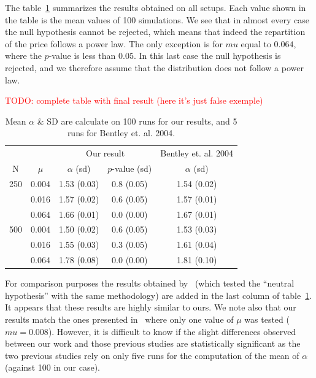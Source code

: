 \documentclass{wscpaperproc}
\newcommand{\memo}[2]{\textcolor{#1}{#2}}
\newcommand{\todo}[1]{\memo{red}{TODO: #1\\}}
\begin{document}

The table~\ref{tab:mualpha} summarizes the results obtained on all setups. Each value shown in the table is the mean values of 100 simulations. We see that in almost every case the null hypothesis cannot be rejected, which means that indeed the repartition of the price follows a power law. The only exception is for $mu$ equal to $0.064$, where the $p$-value is less than $0.05$. In this last case the null hypothesis is rejected, and we therefore assume that the distribution does not follow a power law.

\todo{complete table with final result (here it's just false exemple)}
\begin{table}[!h]
	\centering
	\begin{tabular}{cc|ccc}
		\multicolumn{2}{r}{}&\multicolumn{2}{c}{Our result}&\multicolumn{1}{c}{Bentley et. al. 2004}\\
			N&$\mu$ & $\alpha$ (sd) & $p$-value (sd) &$\alpha$ (sd)\\\hline
		250	&0.004&1.53 (0.03)&0.8 (0.05)&1.54 (0.02)\\
			&0.016&1.57 (0.02)&0.6 (0.05)&1.57 (0.01)\\
			&0.064&1.66 (0.01)&0.0 (0.00)&1.67 (0.01)\\\hline
		500	&0.004&1.50 (0.02)&0.6 (0.05)&1.53 (0.03)\\
			&0.016&1.55 (0.03)&0.3 (0.05)&1.61 (0.04)\\
			&0.064&1.78 (0.08)&0.0 (0.00)&1.81 (0.10)\\
	\end{tabular}
	\caption{Mean $\alpha$ \& SD are calculate on 100 runs for our results, and 5 runs for Bentley et. al. 2004.}
	\label{tab:mualpha}
\end{table}

For comparison purposes the results obtained by~\cite{bentley_random_2004} (which tested the ``neutral hypothesis'' with the same methodology) are added in the last column of table~\ref{tab:mualpha}. It appears that these results are highly similar to ours. We note also that our results match the ones presented in~\cite{mesoudi_random_2009} where only one value of $\mu$ was tested ($mu = 0.008$). However, it is difficult to know if the slight differences observed between our work and those previous studies are statistically significant as the two previous studies rely on only five runs for the computation of the mean of $\alpha$ (against 100 in our case).
\end{document}
